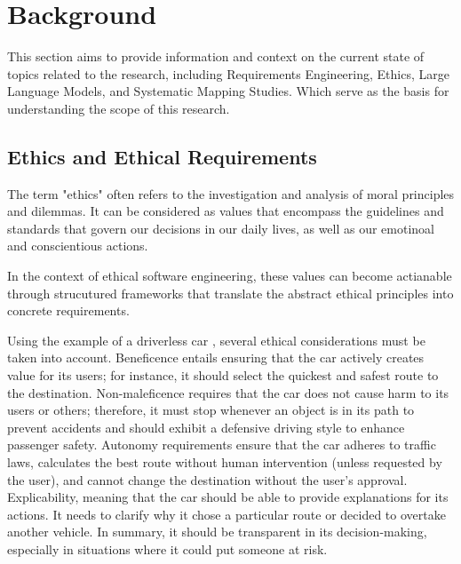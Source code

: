 
%

\makeatletter
\newcommand{\ntifpkgloaded}{%
  \@ifpackageloaded%
}
\makeatother

\chapter{Background}
\label{cha:Background}

This section aims to provide information and context on the current state of topics related to the research, including Requirements Engineering, Ethics, 
Large Language Models, and Systematic Mapping Studies. Which serve as the basis for understanding the scope of this research.

\section{Ethics and Ethical Requirements}
The term "ethics" often refers to the investigation and analysis of moral principles and dilemmas. It can be considered as values that encompass the guidelines and standards that govern our decisions in our daily lives,
as well as our emotinoal and conscientious actions.

In the context of ethical software engineering, these values can become actianable through strucutured frameworks that translate the abstract ethical principles into concrete requirements. \cite{spiekermann2022values}

Using the example of a driverless car \cite{guizzardi2023ontology}, several ethical considerations must be taken into account. Beneficence entails ensuring that the car actively creates value 
for its users; for instance, it should select the quickest and safest route to the destination. Non-maleficence requires that the car does not cause harm to its users or others; therefore, 
it must stop whenever an object is in its path to prevent accidents and should exhibit a defensive driving style to enhance passenger safety. Autonomy requirements ensure that the car adheres 
to traffic laws, calculates the best route without human intervention (unless requested by the user), and cannot change the destination without the user’s approval. Explicability, meaning that 
the car should be able to provide explanations for its actions. It needs to clarify why it chose a particular route or decided to overtake another vehicle. In summary, it should be transparent 
in its decision-making, especially in situations where it could put someone at risk.

